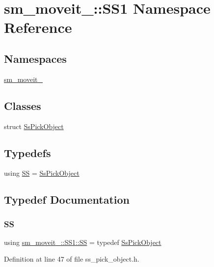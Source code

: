 \hypertarget{namespacesm__moveit__4_1_1SS1}{}\section{sm\+\_\+moveit\+\_\+:\+:S\+S1 Namespace Reference}
\label{namespacesm__moveit__4_1_1SS1}
\subsection*{Namespaces}
\begin{DoxyCompactItemize}
\item 
 \hyperlink{namespacesm__moveit__4_1_1SS1_1_1sm__moveit__4}{sm\+\_\+moveit\+\_}
\end{DoxyCompactItemize}
\subsection*{Classes}
\begin{DoxyCompactItemize}
\item 
struct \hyperlink{structsm__moveit__4_1_1SS1_1_1SsPickObject}{Ss\+Pick\+Object}
\end{DoxyCompactItemize}
\subsection*{Typedefs}
\begin{DoxyCompactItemize}
\item 
using \hyperlink{namespacesm__moveit__4_1_1SS1_ad500449ae868ad33373ac600bd4871d1}{SS} = \hyperlink{structsm__moveit__4_1_1SS1_1_1SsPickObject}{Ss\+Pick\+Object}
\end{DoxyCompactItemize}


\subsection{Typedef Documentation}
\mbox{\label{namespacesm__moveit__4_1_1SS1_ad500449ae868ad33373ac600bd4871d1}} 
\subsubsection{\texorpdfstring{SS}{SS}}
{\footnotesize\ttfamily using \hyperlink{namespacesm__moveit__4_1_1SS1_ad500449ae868ad33373ac600bd4871d1}{sm\+\_\+moveit\+\_\+::\+S\+S1\+::\+SS} = typedef \hyperlink{structsm__moveit__4_1_1SS1_1_1SsPickObject}{Ss\+Pick\+Object}}



Definition at line 47 of file ss\+\_\+pick\+\_\+object.\+h.


